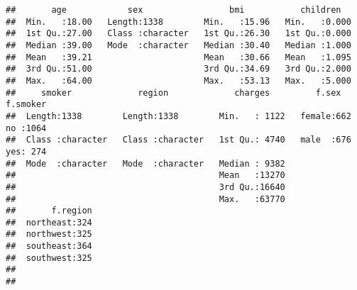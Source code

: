 \documentclass[
]{article}
\newenvironment{Shaded}{\begin{snugshade}}{\end{snugshade}}
\newcommand{\AttributeTok}[1]{\textcolor[rgb]{0.77,0.63,0.00}{#1}}
\newcommand{\CommentTok}[1]{\textcolor[rgb]{0.56,0.35,0.01}{\textit{#1}}}
\newcommand{\FunctionTok}[1]{\textcolor[rgb]{0.00,0.00,0.00}{#1}}
\newcommand{\NormalTok}[1]{#1}
\newcommand{\OtherTok}[1]{\textcolor[rgb]{0.56,0.35,0.01}{#1}}
\newcommand{\SpecialCharTok}[1]{\textcolor[rgb]{0.00,0.00,0.00}{#1}}
\newcommand{\StringTok}[1]{\textcolor[rgb]{0.31,0.60,0.02}{#1}}
\begin{document}
\begin{Shaded}
\end{Shaded}

\begin{verbatim}
##       age            sex                 bmi           children    
##  Min.   :18.00   Length:1338        Min.   :15.96   Min.   :0.000  
##  1st Qu.:27.00   Class :character   1st Qu.:26.30   1st Qu.:0.000  
##  Median :39.00   Mode  :character   Median :30.40   Median :1.000  
##  Mean   :39.21                      Mean   :30.66   Mean   :1.095  
##  3rd Qu.:51.00                      3rd Qu.:34.69   3rd Qu.:2.000  
##  Max.   :64.00                      Max.   :53.13   Max.   :5.000  
##     smoker             region             charges         f.sex     f.smoker  
##  Length:1338        Length:1338        Min.   : 1122   female:662   no :1064  
##  Class :character   Class :character   1st Qu.: 4740   male  :676   yes: 274  
##  Mode  :character   Mode  :character   Median : 9382                          
##                                        Mean   :13270                          
##                                        3rd Qu.:16640                          
##                                        Max.   :63770                          
##       f.region  
##  northeast:324  
##  northwest:325  
##  southeast:364  
##  southwest:325  
##                 
## 
\end{verbatim}
\end{document}

